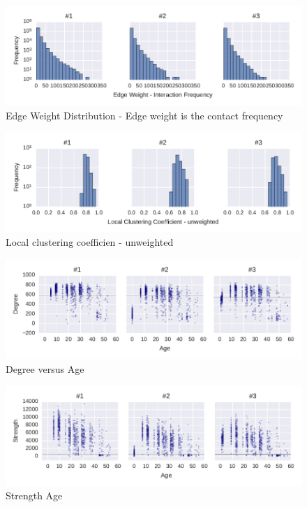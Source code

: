 \begin{figure}[htb]
	\centering
	\includegraphics[width=1.0\textwidth]{Figures/stat-edgeWeightDist}
	\caption[Edge Weight Distribution]{Edge Weight Distribution - Edge weight is the contact frequency}
	\label{fig:statEdgeWeightDist}
\end{figure}


\begin{figure}[htb]
	\centering
	\includegraphics[width=1.0\textwidth]{Figures/stat-lccDist}
	\caption[Local clustering coefficien]{Local clustering coefficien - unweighted}
	\label{fig:lccDist}
\end{figure}


\begin{figure}[htb]
	\centering
	\includegraphics[width=1.0\textwidth]{Figures/stat-degreeAge}
	\caption[Degree VS Age]{Degree versus Age}
	\label{fig:degreeAge}
\end{figure}


\begin{figure}[htb]
	\centering
	\includegraphics[width=1.0\textwidth]{Figures/stat-strengthAge}
	\caption[Strength Age]{Strength Age}
	\label{fig:strengthAge}
\end{figure}	


